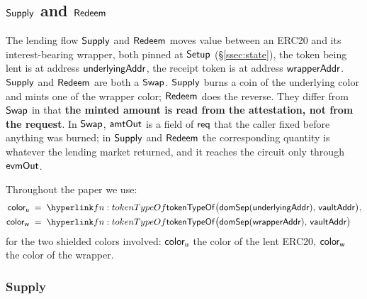 \subsection{\texorpdfstring{$\mathsf{Supply}$ and $\mathsf{Redeem}$}{Supply and Redeem}}
\label{ssec:lendinst}

The lending flow $\mathsf{Supply}$ and $\mathsf{Redeem}$ moves value between an ERC20 and its interest-bearing wrapper, both pinned at
$\mathsf{Setup}$ (\S\ref{ssec:state}), the token being lent is
at address $\mathsf{underlyingAddr}$, the receipt token is at address $\mathsf{wrapperAddr}$.
$\mathsf{Supply}$ and $\mathsf{Redeem}$ are both a $\mathsf{Swap}$.
$\mathsf{Supply}$ burns a coin of the underlying
color and mints one of the wrapper color; $\mathsf{Redeem}$ does the reverse.  They differ from
$\mathsf{Swap}$ in  that  \textbf{the minted amount is read from the attestation, not from
the request}. In $\mathsf{Swap}$, $\mathsf{amtOut}$ is a field of $\mathsf{req}$ that the caller fixed before
anything was burned; in $\mathsf{Supply}$ and $\mathsf{Redeem}$ the corresponding quantity is whatever the
lending market returned, and it reaches the circuit only through $\mathsf{evmOut}$.


Throughout the paper we use:
\begin{align*}
  \colrU &\;=\; \lnk{fn:tokenTypeOf}{\tokenTypeOf}\bigl(\domSep(\underAddr),\, \vaultAddr\bigr), \\
  \colrW &\;=\; \lnk{fn:tokenTypeOf}{\tokenTypeOf}\bigl(\domSep(\wrapAddr),\, \vaultAddr\bigr)
\end{align*}
for the two shielded colors involved: $\mathsf{color}_{\mathsf{u}}$ the color of the lent ERC20, $\mathsf{color}_{\mathsf{w}}$ the color of
the wrapper.

\subsubsection{Supply}

